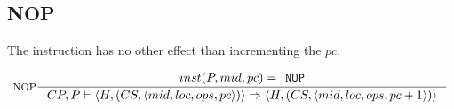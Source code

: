 

\subsection{NOP}
The instruction has no other effect than incrementing the $pc$.


$$\inference[NOP]{inst(P, mid, pc) = \texttt{NOP}}
{CP, P \vdash \langle H, (CS, \langle mid, loc, ops, pc \rangle)\rangle \Rightarrow 
 \langle H, (CS, \langle mid, loc, ops, pc + 1 \rangle)\rangle
}$$


